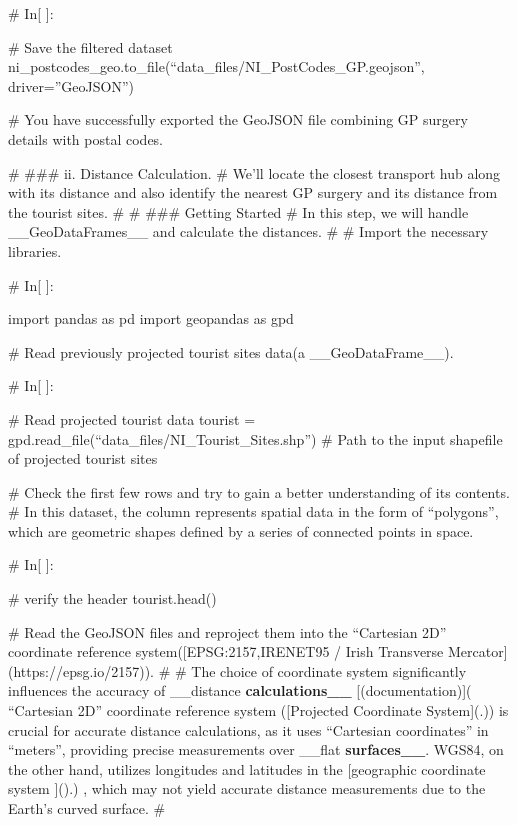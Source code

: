 \documentclass[letterpaper,10pt,english]{sphinxmanual}
\begin{document}
\sphinxAtStartPar
\# In{[} {]}:

\sphinxAtStartPar
\# Save the filtered dataset
ni\_postcodes\_geo.to\_file(“data\_files/NI\_PostCodes\_GP.geojson”, driver=”GeoJSON”)

\sphinxAtStartPar
\# You have successfully exported the GeoJSON file combining GP surgery details with postal codes.

\sphinxAtStartPar
\# \#\#\# ii. Distance Calculation.
\# We’ll locate the closest transport hub along with its distance and also identify the nearest GP surgery and its distance from the tourist sites.
\#
\# \#\#\# Getting Started
\# In this step, we will handle \_\_GeoDataFrames\_\_ and calculate the distances.
\#
\# Import the necessary libraries.

\sphinxAtStartPar
\# In{[} {]}:

\sphinxAtStartPar
import pandas as pd
import geopandas as gpd

\sphinxAtStartPar
\# Read previously projected tourist sites data(a \_\_GeoDataFrame\_\_).

\sphinxAtStartPar
\# In{[} {]}:

\sphinxAtStartPar
\# Read projected tourist data
tourist = gpd.read\_file(“data\_files/NI\_Tourist\_Sites.shp”)  \# Path to the input shapefile of projected tourist sites

\sphinxAtStartPar
\# Check the first few rows and try to gain a better understanding of its contents.
\# In this dataset, the  column represents spatial data in the form of “polygons”, which are geometric shapes defined by a series of connected points in space.

\sphinxAtStartPar
\# In{[} {]}:

\sphinxAtStartPar
\# verify the header
tourist.head()

\sphinxAtStartPar
\# Read the GeoJSON files and reproject them into the “Cartesian 2D” coordinate reference system({[}EPSG:2157,IRENET95 / Irish Transverse Mercator{]}(https://epsg.io/2157)).
\#
\# The choice of coordinate system significantly influences the accuracy of \_\_distance {\color{red}\bfseries{}calculations\_\_} {[}(documentation){]}( “Cartesian 2D” coordinate reference system ({[}Projected Coordinate System{]}(.)) is crucial for accurate distance calculations, as it uses “Cartesian coordinates” in “meters”, providing precise measurements over \_\_flat {\color{red}\bfseries{}surfaces\_\_}. WGS84, on the other hand, utilizes longitudes and latitudes in the {[}geographic coordinate system {]}().) , which may not yield accurate distance measurements due to the Earth’s curved surface.
\#
\end{document}
